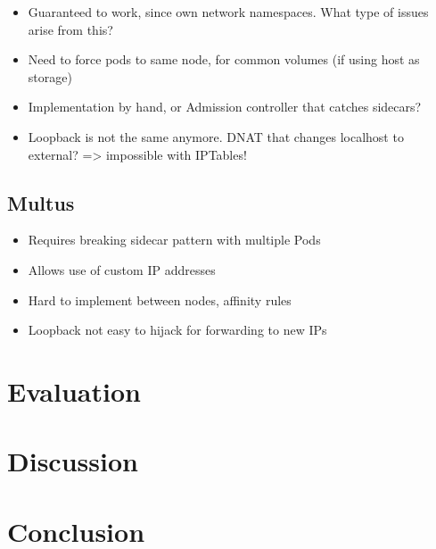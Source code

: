 \documentclass[english,12pt,a4paper,pdftex,sci,utf8]{aaltothesis}
\begin{document}
\begin{itemize}
  \item Guaranteed to work, since own network namespaces. What type of issues arise from this?
  \item Need to force pods to same node, for common volumes (if using host as storage)
  \item Implementation by hand, or Admission controller that catches sidecars?
  \item Loopback is not the same anymore. DNAT that changes localhost to external? => impossible with IPTables!
\end{itemize}

\subsection{Multus}

\begin{itemize}
  \item Requires breaking sidecar pattern with multiple Pods
  \item Allows use of custom IP addresses
  \item Hard to implement between nodes, affinity rules
  \item Loopback not easy to hijack for forwarding to new IPs
\end{itemize}

\clearpage

\section{Evaluation} \label{section-solution}

\clearpage

\section{Discussion} \label{section-discussion}

\clearpage

\section{Conclusion} \label{section-conclusion}

\clearpage


\thesisbibliography
\printbibliography
\end{document}
